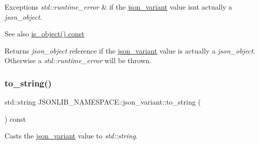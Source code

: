 \begin{DoxyExceptions}{Exceptions}
{\em std\+::runtime\+\_\+error} & if the \hyperlink{classJSONLIB__NAMESPACE_1_1json__variant}{json\+\_\+variant} value isn\textquotesingle{}t actually a {\itshape json\+\_\+object}. \\
\hline
\end{DoxyExceptions}
\begin{DoxySeeAlso}{See also}
\hyperlink{classJSONLIB__NAMESPACE_1_1json__variant_a28b4156626bd9f0e344ba1704c7590f3}{is\+\_\+object() const} 
\end{DoxySeeAlso}
\begin{DoxyReturn}{Returns}
{\itshape json\+\_\+object} reference if the \hyperlink{classJSONLIB__NAMESPACE_1_1json__variant}{json\+\_\+variant} value is actually a {\itshape json\+\_\+object}. Otherwise a {\itshape std\+::runtime\+\_\+error} will be thrown. 
\end{DoxyReturn}
\mbox{\label{classJSONLIB__NAMESPACE_1_1json__variant_a6bbb59173d134b69cded2d3da3a1b70f}} 
\subsubsection{\texorpdfstring{to\+\_\+string()}{to\_string()}\hspace{0.1cm}{\footnotesize\ttfamily [1/2]}}
{\footnotesize\ttfamily std\+::string J\+S\+O\+N\+L\+I\+B\+\_\+\+N\+A\+M\+E\+S\+P\+A\+C\+E\+::json\+\_\+variant\+::to\+\_\+string (\begin{DoxyParamCaption}{ }\end{DoxyParamCaption}) const}



Casts the \hyperlink{classJSONLIB__NAMESPACE_1_1json__variant}{json\+\_\+variant} value to {\itshape std\+::string}. 


